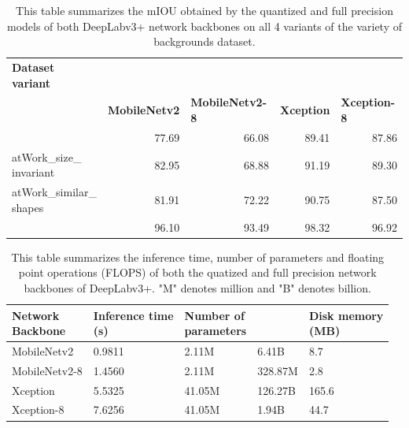 	\begin{table}
		\begin{tabular}{|l|r|r|r|r|}
		\hline
		\makecell{\textbf{Dataset} \\ \textbf{variant}} & \multicolumn{ 4}{l|}{\makecell{\textbf{mIOU in \%}}} \\ \cline{ 2- 5}
		\multicolumn{ 1}{|l|}{} & \multicolumn{1}{l|}{\textbf{MobileNetv2}} & \multicolumn{1}{l|}{\textbf{MobileNetv2-8}} & \multicolumn{1}{l|}{\textbf{Xception}} & \multicolumn{1}{l|}{\textbf{Xception-8}} \\ \hline
		\makecell{atWork\_full} & 77.69 & 66.08 & 89.41 & 87.86 \\ \hline
		\makecell{atWork\_size\_\\invariant} & 82.95 & 68.88 & 91.19 & 89.30 \\ \hline
		\makecell{atWork\_similar\_\\shapes} & 81.91 & 72.22 & 90.75 & 87.50 \\ \hline
		\makecell{atWork\_binary} & 96.10 & 93.49 & 98.32 & 96.92 \\ \hline
		\end{tabular}
		\caption{This table summarizes the mIOU obtained by the quantized and full precision models of both DeepLabv3+ network backbones on all 4 variants of the variety of backgrounds dataset.}
		\label{Table:quantmIOU}
	\end{table}
	
	\begin{table}
		\centering
		\begin{tabular}{|l|l|l|l|l|}
		\hline
		\makecell{\textbf{Network} \\ \textbf{Backbone}} & \makecell{\textbf{Inference time} \\ \textbf{(s)}} & \makecell{\textbf{Number of} \\ \textbf{parameters}} & \makecell{\textbf{FLOPS}} & \makecell{\textbf{Disk memory} \\ \textbf{(MB)}} \\ \hline
		MobileNetv2 & 0.9811 & 2.11M & 6.41B & 8.7 \\ \hline
		MobileNetv2-8 & 1.4560 & 2.11M & 328.87M & 2.8 \\ \hline
		Xception & 5.5325 & 41.05M & 126.27B & 165.6 \\ \hline
		Xception-8 & 7.6256 & 41.05M & 1.94B & 44.7 \\ \hline
		\end{tabular}
		\caption{This table summarizes the inference time, number of parameters and floating point operations (FLOPS) of both the quatized and full precision network backbones of DeepLabv3+. "M" denotes million and "B" denotes billion.}
		\label{Table:quantMetrics}
	\end{table}
	
